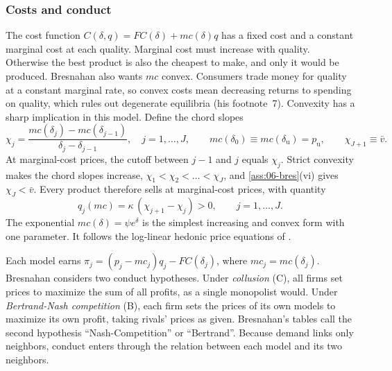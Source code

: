 \subsubsection{Costs and conduct}\label{sec:06-bres-conduct}

The cost function $C(\delta,q) = FC(\delta) + mc(\delta)q$ has a fixed cost and a constant marginal cost at each
quality. Marginal cost must increase with quality. Otherwise the best product is also the cheapest to make, and only
it would be produced. Bresnahan also wants $mc$ convex. Consumers trade money for quality at a constant marginal
rate, so convex costs mean decreasing returns to spending on quality, which rules out degenerate equilibria (his
footnote~7). Convexity has a sharp implication in this model. Define the chord slopes
\begin{equation}\label{eq:06-bres-chord}
  \chi_j = \frac{mc(\delta_j) - mc(\delta_{j-1})}{\delta_j - \delta_{j-1}},\quad j = 1,\dots,J,
  \qquad mc(\delta_0) \equiv mc(\delta_{\mathrm u}) = p_{\mathrm u},
  \qquad \chi_{J+1} \equiv \bar v .
\end{equation}
At marginal-cost prices, the cutoff between $j-1$ and $j$ equals $\chi_j$. Strict convexity makes the chord slopes
increase, $\chi_1 < \chi_2 < \dots < \chi_J$, and \cref{ass:06-bres}(vi) gives $\chi_J < \bar v$.
Every product therefore sells at marginal-cost prices, with quantity
\begin{equation}\label{eq:06-bres-qmc}
  q_j(mc) = \kappa\,(\chi_{j+1} - \chi_j) > 0, \qquad j = 1,\dots,J .
\end{equation}
The exponential $mc(\delta) = \psi e^{\delta}$ is the simplest increasing and convex form with one parameter. It
follows the log-linear hedonic price equations of \citet{OhtaGriliches1976}.

Each model earns $\pi_j = (p_j - mc_j)q_j - FC(\delta_j)$, where $mc_j = mc(\delta_j)$. Bresnahan considers two
conduct hypotheses. Under \emph{collusion} (C), all firms set prices to maximize the sum of all profits, as a single
monopolist would. Under \emph{Bertrand-Nash competition} (B), each firm sets the prices of its own models to
maximize its own profit, taking rivals' prices as given. Bresnahan's tables call the second hypothesis
``Nash-Competition'' or ``Bertrand''. Because demand links only neighbors, conduct enters through the relation
between each model and its two neighbors.

